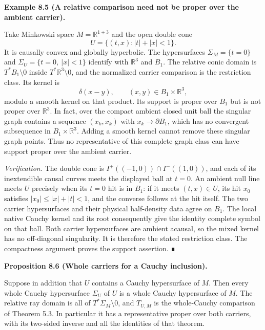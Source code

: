 \documentclass[
  english,
  11pt,
  reqno]{amsart}
\makeatletter
\newcommand{\pandocstatementheading}[1]{%
  \par\addpenalty{\@beginparpenalty}%
  \addvspace{.5\baselineskip plus .2\baselineskip minus .2\baselineskip}%
  {\normalfont\bfseries #1\par}%
  \nobreak\@afterindenttrue\@afterheading
}
\makeatother
\begin{document}
\pandocstatementheading{\protect{}\label{ex:relative-carrier-nonproperness}Example 8.5 (A relative comparison need not be proper over the ambient
carrier).}

Take Minkowski space \(M=\mathbb R^{1+3}\) and the open double cone \[
U=\{(t,x):|t|+|x|<1\}.
\] It is causally convex and globally hyperbolic. The hypersurfaces
\(\Sigma_M=\{t=0\}\) and \(\Sigma_U=\{t=0,\ |x|<1\}\) identify with
\(\mathbb R^3\) and \(B_1\). The relative conic domain is
\(T^*B_1\setminus0\) inside \(T^*\mathbb R^3\setminus0\), and the
normalized carrier comparison is the restriction class. Its kernel is \[
\delta(x-y),\qquad (x,y)\in B_1\times\mathbb R^3,
\] modulo a smooth kernel on that product. Its support is proper over
\(B_1\) but is not proper over \(\mathbb R^3\). In fact, over the
compact ambient closed unit ball the singular graph contains a sequence
\((x_k,x_k)\) with \(x_k\to\partial B_1\), which has no convergent
subsequence in \(B_1\times\mathbb R^3\). Adding a smooth kernel cannot
remove these singular graph points. Thus no representative of this
complete graph class can have support proper over the ambient carrier.

\emph{Verification.} The double cone is \(I^+((-1,0))\cap I^-((1,0))\),
and each of its inextendible causal curves meets the displayed ball at
\(t=0\). An ambient null line meets \(U\) precisely when its \(t=0\) hit
is in \(B_1\): if it meets \((t,x)\in U\), its hit \(x_0\) satisfies
\(|x_0|\le |x|+|t|<1\), and the converse follows at the hit itself. The
two carrier hypersurfaces and their physical half-density data agree on
\(B_1\). The local native Cauchy kernel and its root consequently give
the identity complete symbol on that ball. Both carrier hypersurfaces
are ambient acausal, so the mixed kernel has no off-diagonal
singularity. It is therefore the stated restriction class. The
compactness argument proves the support assertion. ∎

\pandocstatementheading{\protect{}\label{prop:cauchy-open-whole-carriers}Proposition 8.6 (Whole carriers for a Cauchy inclusion).}

Suppose in addition that \(U\) contains a Cauchy hypersurface of \(M\).
Then every whole Cauchy hypersurface \(\Sigma_U\) of \(U\) is a whole
Cauchy hypersurface of \(M\). The relative ray domain is all of
\(T^*\Sigma_M\setminus0\), and \(T_{U,M}\) is the whole-Cauchy
comparison of Theorem 5.3. In particular it has a representative proper
over both carriers, with its two-sided inverse and all the identities of
that theorem.
\end{document}
